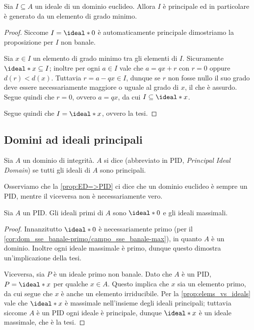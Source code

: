 \begin{proposition}
    \label{prop:ED=>PID}
    Sia $I \subseteq A$ un ideale di un dominio euclideo. Allora $I$ è principale ed in particolare è generato da un elemento di grado minimo.
\end{proposition}
\begin{proof}
    Siccome $I = \ideal*{0}$ è automaticamente principale dimostriamo la proposizione per $I$ non banale.

    Sia $x \in I$ un elemento di grado minimo tra gli elementi di $I$. Sicuramente $\ideal*{x} \subseteq I$; inoltre per ogni $a \in I$ vale che $a = qx + r$ con $r = 0$ oppure $d(r) < d(x)$. Tuttavia $r = a - qx \in I$, dunque se $r$ non fosse nullo il suo grado deve essere necessariamente maggiore o uguale al grado di $x$, il che è assurdo. Segue quindi che $r = 0$, ovvero $a = qx$, da cui $I \subseteq \ideal*{x}$.
    
    Segue quindi che $I = \ideal*{x}$, ovvero la tesi.
\end{proof}

\subsection{Domini ad ideali principali}

\begin{definition}
    Sia $A$ un dominio di integrità. $A$ si dice  (abbreviato in PID, \emph{Principal Ideal Domain}) se tutti gli ideali di $A$ sono principali.
\end{definition}

Osserviamo che la \autoref{prop:ED=>PID} ci dice che un dominio euclideo è sempre un PID, mentre il viceversa non è necessariamente vero.

\begin{proposition}
    Sia $A$ un PID. Gli ideali primi di $A$ sono $\ideal*{0}$ e gli ideali massimali.
\end{proposition}
\begin{proof}
    Innanzitutto $\ideal*{0}$ è necessariamente primo (per il \autoref{cor:dom_sse_banale-primo/campo_sse_banale-max}), in quanto $A$ è un dominio. Inoltre ogni ideale massimale è primo, dunque questo dimostra un'implicazione della tesi.

    Viceversa, sia $P$ è un ideale primo non banale. Dato che $A$ è un PID, $P = \ideal*{x}$ per qualche $x \in A$. Questo implica che $x$ sia un elemento primo, da cui segue che $x$ è anche un elemento irriducibile. Per la \autoref{prop:elems_vs_ideals} vale che $\ideal*{x}$ è massimale nell'insieme degli ideali principali; tuttavia siccome $A$ è un PID ogni ideale è principale, dunque $\ideal*{x}$ è un ideale massimale, che è la tesi.
\end{proof}

